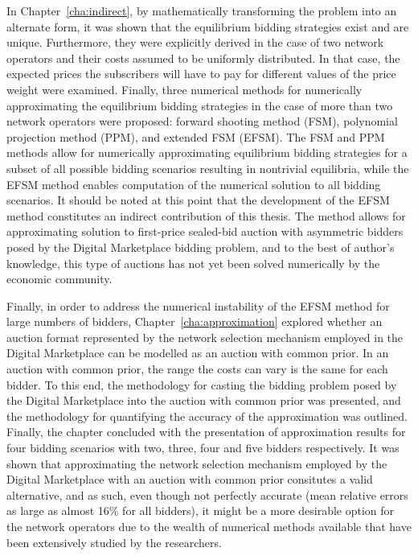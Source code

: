 In Chapter~\ref{cha:indirect}, by mathematically transforming the problem into an alternate form, it was shown that the equilibrium bidding strategies exist and are unique. Furthermore, they were explicitly derived in the case of two network operators and their costs assumed to be uniformly distributed. In that case, the expected prices the subscribers will have to pay for different values of the price weight were examined. Finally, three numerical methods for numerically approximating the equilibrium bidding strategies in the case of more than two network operators were proposed: forward shooting method (FSM), polynomial projection method (PPM), and extended FSM (EFSM). The FSM and PPM methods allow for numerically approximating equilibrium bidding strategies for a subset of all possible bidding scenarios resulting in nontrivial equilibria, while the EFSM method enables computation of the numerical solution to all bidding scenarios. It should be noted at this point that the development of the EFSM method constitutes an indirect contribution of this thesis. The method allows for approximating solution to first-price sealed-bid auction with asymmetric bidders posed by the Digital Marketplace bidding problem, and to the best of author's knowledge, this type of auctions has not yet been solved numerically by the economic community.

Finally, in order to address the numerical instability of the EFSM method for large numbers of bidders, Chapter~\ref{cha:approximation} explored whether an auction format represented by the network selection mechanism employed in the Digital Marketplace can be modelled as an auction with common prior. In an auction with common prior, the range the costs can vary is the same for each bidder. To this end, the methodology for casting the bidding problem posed by the Digital Marketplace into the auction with common prior was presented, and the methodology for quantifying the accuracy of the approximation was outlined. Finally, the chapter concluded with the presentation of approximation results for four bidding scenarios with two, three, four and five bidders respectively. It was shown that approximating the network selection mechanism employed by the Digital Marketplace with an auction with common prior consitutes a valid alternative, and as such, even though not perfectly accurate (mean relative errors as large as almost 16\% for all bidders), it might be a more desirable option for the network operators due to the wealth of numerical methods available that have been extensively studied by the researchers.

